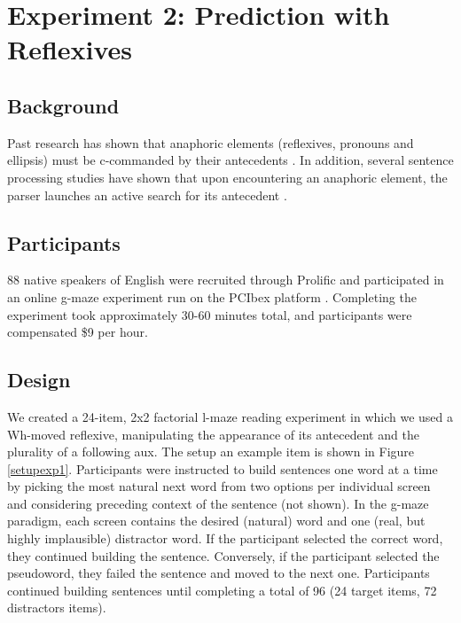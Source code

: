 \documentclass[12pt]{article}
\begin{document}
\section{Experiment 2: Prediction with Reflexives} 
\subsection{Background}
Past research has shown that anaphoric elements (reflexives, pronouns and ellipsis) must be c-commanded
by their antecedents \cite{Chomsky1981}. In addition, several sentence processing studies have shown that upon encountering an anaphoric element, the parser launches an active search for its antecedent \cite{Sturt2003,Kazanina-Lau-Lieberman-Yoshida-Phillips2007,Yoshida-Dickey-Sturt2013}.

\subsection{Participants}
88 native speakers of English were recruited through Prolific and participated in an online g-maze \cite{Forster-Guerrera-Elliot2009} experiment run on the PCIbex platform \cite{Zehr-Schwarz2018}. Completing the experiment took approximately 30-60 minutes total, and participants were compensated \$9 per hour.

\subsection{Design}
We created a 24-item, 2x2 factorial l-maze reading experiment in which we used a Wh-moved reflexive, manipulating the appearance of its antecedent and the plurality of a following aux. The setup an example item is shown in Figure \ref{setupexp1}.  Participants were instructed to build sentences one word at a time by picking the most natural next word from two options per individual screen and considering preceding context of the sentence (not shown). In the g-maze paradigm, each screen contains the desired (natural) word and one (real, but highly implausible) distractor word. If the participant selected the correct word, they continued building the sentence. Conversely, if the participant selected the pseudoword, they failed the sentence and moved to the next one. Participants continued building sentences until completing a total of 96 (24 target items, 72 distractors items).
\end{document}
